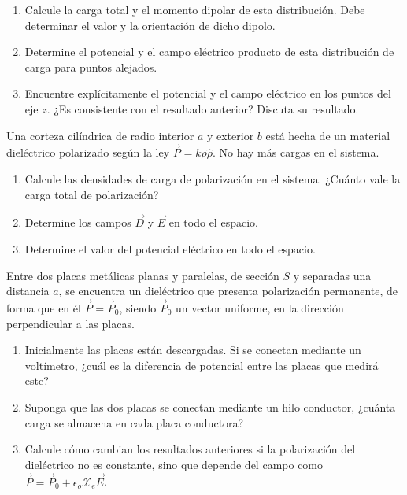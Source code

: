 \begin{enumerate}[label=\alph*)]
    \item Calcule la carga total y el momento dipolar de esta distribución. Debe determinar el valor y la orientación de dicho dipolo.
    \item Determine el potencial y el campo eléctrico producto de esta distribución de carga para puntos alejados.
    \item Encuentre explícitamente el potencial y el campo eléctrico en los puntos del eje $z$. ¿Es consistente con el resultado anterior? Discuta su resultado.
\end{enumerate}
\bigbreak

\np

Una corteza cilíndrica de radio interior $a$ y exterior $b$ está hecha de un material dieléctrico polarizado según la ley $\Vec{P} = k\rho\hat{\rho}$. No hay más cargas en el sistema.

\begin{enumerate}[label=\alph*)]
    \item Calcule las densidades de carga de polarización en el sistema. ¿Cuánto vale la carga total de polarización?
    \item Determine los campos $\Vec{D}$ y $\Vec{E}$ en todo el espacio.
    \item Determine el valor del potencial eléctrico en todo el espacio.
\end{enumerate}

\bigbreak

\np

Entre dos placas metálicas planas y paralelas, de sección $S$ y separadas una distancia $a$, se encuentra un dieléctrico que presenta polarización permanente, de forma que en él $\Vec{P} = \Vec{P}_0$, siendo $\Vec{P}_0$ un vector uniforme, en la dirección perpendicular a las placas.

\begin{enumerate}[label=\alph*)]
    \item Inicialmente las placas están descargadas. Si se conectan mediante un voltímetro, ¿cuál es la diferencia de potencial entre las placas que medirá este?
    \item  Suponga que las dos placas se conectan mediante un hilo conductor, ¿cuánta carga se almacena en cada placa conductora?
    \item Calcule cómo cambian los resultados anteriores si la polarización del dieléctrico no es constante, sino que depende del campo como $\Vec{P} = \Vec{P}_0 + \epsilon_o
    \mathcal{X}_e\Vec{E}$.
\end{enumerate}


